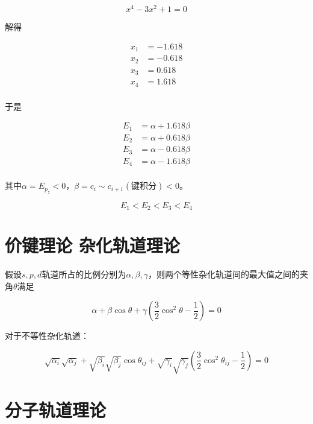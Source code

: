 \begin{equation*}
    x^4 - 3x^2 + 1 = 0
\end{equation*}

解得

\begin{align*}
    x_1 & = -1.618 \\
    x_2 & = -0.618 \\
    x_3 & = 0.618  \\
    x_4 & = 1.618  \\
\end{align*}

于是

\begin{align*}
    E_1 & = \alpha + 1.618\beta \\
    E_2 & = \alpha + 0.618\beta \\
    E_3 & = \alpha - 0.618\beta \\
    E_4 & = \alpha - 1.618\beta \\
\end{align*}

其中$\alpha = E_{p_z} < 0$，$\beta = c_i \sim c_{i+1} (\mbox{键积分}) < 0$。


\begin{equation*}
    E_1 < E_2 < E_3 < E_4
\end{equation*}

\section{价键理论 杂化轨道理论}

假设$s,p,d$轨道所占的比例分别为$\alpha, \beta, \gamma$，则两个等性杂化轨道间的最大值之间的夹角$\theta$满足

\begin{equation*}
    \alpha + \beta \cos \theta + \gamma \left(\frac{3}{2}\cos ^2 \theta - \frac{1}{2}\right) = 0
\end{equation*}

对于不等性杂化轨道：

\begin{equation*}
    \sqrt{\alpha_i} \sqrt{\alpha_j} + \sqrt{\beta_i}{\sqrt{\beta_j}} \cos \theta_{ij} + \sqrt{\gamma_i}\sqrt{\gamma_j} \left( \frac{3}{2} \cos ^2 \theta_{ij} - \frac{1}{2}  \right)= 0
\end{equation*}

\section{分子轨道理论}
